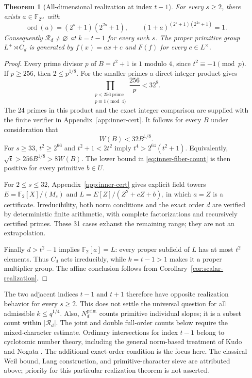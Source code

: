 \documentclass[11pt]{article}
\newtheorem{theorem}{Theorem}[section]
\begin{document}
\begin{theorem}[All-dimensional realization at index $t-1$]
\label{thm:inner-all}
For every $s\ge2$, there exists $a\in\mathbb F_{2^{4s}}$ with
\[
 \operatorname{ord}(a)=(2^s+1)(2^{2s}+1),\qquad
 (1+a)^{(2^s+1)(2^{2s}+1)}=1.
\]
Consequently $\mathcal R_d\ne\varnothing$ at $k=t-1$ for every
such $s$. The proper primitive group $L^+\rtimes C_d$ is generated
by $f(x)=ax+c$ and $F(f)$ for every $c\in L^\times$.
\end{theorem}
\begin{proof}
Every prime divisor $p$ of $B=t^2+1$ is $1$ modulo $4$, since
$t^2\equiv-1\pmod p$. If $p\ge256$, then $2\le p^{1/8}$.
For the smaller primes a direct integer product gives
\[
 \prod_{\substack{p<256\ \mathrm{prime}\\p\equiv1\pmod4}}
 \frac{256}{p}<32^8.
\]
The 24 primes in this product and the exact integer comparison
are supplied with the finite verifier in Appendix~\ref{app:inner-cert}.
It follows for every $B$ under consideration that
\[
 W(B)<32B^{1/8}.
\]
For $s\ge33$, $t^2\ge2^{66}$ and $t^2+1<2t^2$ imply
$t^4>2^{64}(t^2+1)$. Equivalently,
$\sqrt t>256B^{1/8}>8W(B)$.
The lower bound in \eqref{eq:inner-fiber-count} is then positive
for every primitive $b\in U$.

For $2\le s\le32$, Appendix~\ref{app:inner-cert} gives explicit
field towers $E=\mathbb F_2[X]/(M_s)$ and
$L=E[Z]/(Z^2+cZ+b)$, in which $a=Z$ is a certificate.
Irreducibility, both norm conditions and the exact order $d$
are verified by deterministic finite arithmetic, with complete
factorizations and recursively certified primes. These 31 cases
exhaust the remaining range; they are not an extrapolation.

Finally $d>t^2-1$ implies $\mathbb F_2[a]=L$: every proper
subfield of $L$ has at most $t^2$ elements. Thus $C_d$ acts
irreducibly, while $k=t-1>1$ makes it a proper multiplier group.
The affine conclusion follows from
Corollary~\ref{cor:scalar-realization}.
\end{proof}

The two adjacent indices $t-1$ and $t+1$ therefore have opposite
realization behavior for every $s\ge2$.
This does not settle the universal question for all admissible
$k\le q^{1/4}$. Also, $N_d^{\mathrm{prim}}$ counts primitive individual slopes;
it is a subset count within $|\mathcal R_d|$. The joint and
double full-order counts below require the mixed-character estimate.
Ordinary intersections for index $t-1$ belong to cyclotomic
number theory, including the general norm-based treatment of
Kudo and Nogata \cite{KN26}. The additional exact-order condition
is the focus here. The classical Weil bound, Lang construction,
and primitive-character sieve are attributed above; priority
for this particular realization theorem is not asserted.
\end{document}
